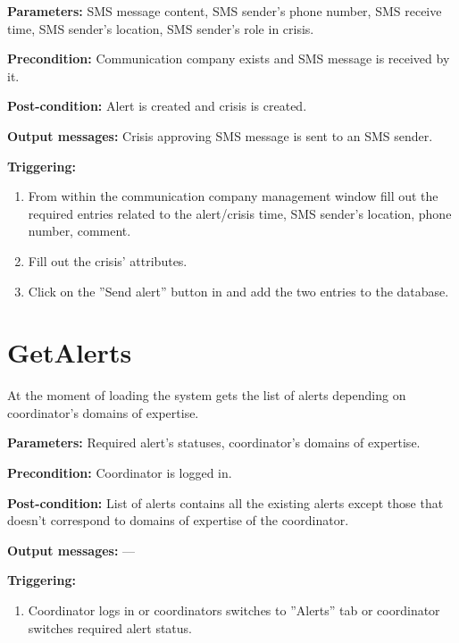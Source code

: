 \begin{description}

\item \textbf{Parameters:} SMS message content, SMS sender's phone number, SMS
receive time, SMS sender's location, SMS sender's role in crisis.
\item \textbf{Precondition:} Communication company exists and SMS message is
received by it.
\item \textbf{Post-condition:} Alert is created and crisis is created.
\item \textbf{Output messages:} Crisis approving SMS message is sent to an SMS
sender.

\item \textbf{Triggering:}
\begin{enumerate}
\item From within the communication company management window fill out the
required entries related to the alert/crisis time, SMS sender's location, phone number, comment.
\item Fill out the crisis' attributes.
\item Click on the ''Send alert'' button in and add the two entries to the
database.
\end{enumerate}
 
\end{description}

\section{GetAlerts}
\label{operation:GetAlerts}
At the moment of loading the system gets the list of alerts depending on
coordinator's domains of expertise.

\begin{description}

\item \textbf{Parameters:} Required alert's statuses, coordinator's domains of
expertise.
\item \textbf{Precondition:} Coordinator is logged in.
\item \textbf{Post-condition:} List of alerts contains all the existing alerts
except those that doesn't correspond to domains of expertise of the coordinator.
\item \textbf{Output messages:} ---

\item \textbf{Triggering:}
\begin{enumerate}
\item Coordinator logs in or coordinators switches to ''Alerts'' tab or
coordinator switches required alert status.
\end{enumerate}
 
\end{description}

